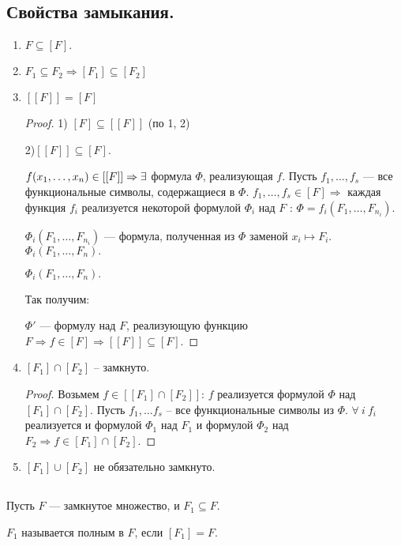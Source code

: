 \subsection{Свойства замыкания.}
\begin{enumerate}
	\item $F \subseteq [F].$
	\item $F_1 \subseteq F_2 \Longrightarrow [F_1] \subseteq [F_2]$
	\item $[[F]] = [F]$
	\begin{proof}
		1) $[F] \subseteq [[F]]$ (по 1, 2)

		2)$[[F]] \subseteq [F]$.

		$f(x_1, \ldots, x_n) \in [[F]] \Rightarrow \exists$ формула $\Phi$, реализующая $f$. Пусть $f_1, \ldots, f_s$ --- все функциональные символы, содержащиеся в $\Phi$. $f_1, \ldots, f_s \in [F] \Rightarrow $ каждая функция $f_i$ реализуется некоторой формулой $\Phi_i$ над $F$ : $\Phi = f_i(F_1, \ldots, F_{n_i})$.

		$\Phi_i(F_1, \ldots, F_{n_i})$ --- формула, полученная из $\Phi$ заменой $x_i \longmapsto F_i$. $\Phi_i(F_1, \ldots, F_n).$

		$\Phi_i(F_1, \ldots, F_n).$

		Так получим: 

		$\Phi'$ --- формулу над $F$, реализующую функцию $F \Rightarrow f \in [F] \Rightarrow [[F]] \subseteq [F]$.
	\end{proof}
	\item  $[F_1] \cap [F_2]$ -- замкнуто.
	\begin{proof}
		Возьмем $f \in [[F_1] \cap [F_2]]$: $f$ реализуется формулой $\Phi$ над $[F_1] \cap [F_2]$. Пусть $f_1, \ldots f_s$ -- все функциональные символы из $\Phi$. $\forall \: i \: f_i$ реализуется и формулой $\Phi_1$ над $F_1$ и формулой $\Phi_2$ над $F_2 \Rightarrow f \in  [F_1] \cap [F_2]$.
	\end{proof}
	\item  $[F_1] \cup [F_2]$ не обязательно замкнуто.
\end{enumerate}

\subsection{}
Пусть $F$ --- замкнутое множество, и $F_1 \subseteq F$.

\begin{definition}
	$F_1$ называется полным в $F$, если $[F_1] = F$.
\end{definition}


